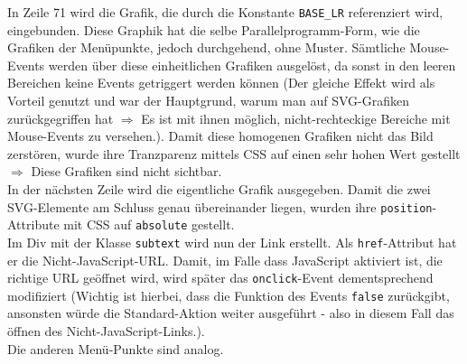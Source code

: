 In Zeile 71 wird die Grafik, die durch die Konstante \texttt{BASE\_LR} referenziert wird, eingebunden. Diese Graphik hat die selbe Parallelprogramm-Form, wie die Grafiken der Menüpunkte, jedoch durchgehend, ohne Muster. Sämtliche Mouse-Events werden über diese einheitlichen Grafiken ausgelöst, da sonst in den leeren Bereichen keine Events getriggert werden können (Der gleiche Effekt wird als Vorteil genutzt und war der Hauptgrund, warum man auf SVG-Grafiken zurückgegriffen hat $ \Longrightarrow $ Es ist mit ihnen möglich, nicht-rechteckige Bereiche mit Mouse-Events zu versehen.). Damit diese homogenen Grafiken nicht das Bild zerstören, wurde ihre Tranzparenz mittels CSS auf einen sehr hohen Wert gestellt $ \Longrightarrow $ Diese Grafiken sind nicht sichtbar.\\
In der nächsten Zeile wird die eigentliche Grafik ausgegeben. Damit die zwei SVG-Elemente am Schluss genau übereinander liegen, wurden ihre \texttt{position}-Attribute mit CSS auf \texttt{absolute} gestellt.\\
Im Div mit der Klasse \texttt{subtext} wird nun der Link erstellt. Als \texttt{href}-Attribut hat er die Nicht-JavaScript-URL. Damit, im Falle dass JavaScript aktiviert ist, die richtige URL geöffnet wird, wird später das \texttt{onclick}-Event dementsprechend modifiziert (Wichtig ist hierbei, dass die Funktion des Events \texttt{false} zurückgibt, ansonsten würde die Standard-Aktion weiter ausgeführt - also in diesem Fall das öffnen des Nicht-JavaScript-Links.).\\
Die anderen Menü-Punkte sind analog.\\
